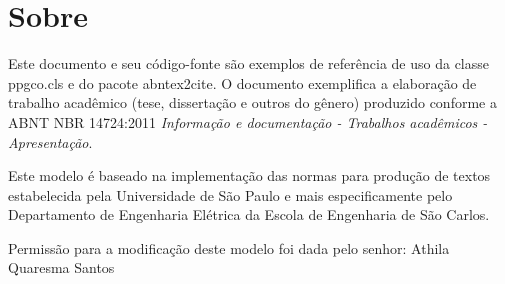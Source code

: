\chapter[Sobre]{Sobre}

Este documento e seu código-fonte são exemplos de referência de uso da classe
\textsf{ppgco.cls} e do pacote \textsf{abntex2cite}. O documento 
exemplifica a elaboração de trabalho acadêmico (tese, dissertação e outros do
gênero) produzido conforme a \ac{ABNT} \ac{NBR} 14724:2011 \emph{Informação e documentação
- Trabalhos acadêmicos - Apresentação}.

Este modelo é baseado na implementação das normas  para produção de textos estabelecida pela Universidade de São Paulo
 e mais especificamente pelo Departamento de Engenharia Elétrica da Escola de Engenharia de São Carlos.

Permissão para a modificação deste modelo foi dada pelo senhor: Athila Quaresma Santos